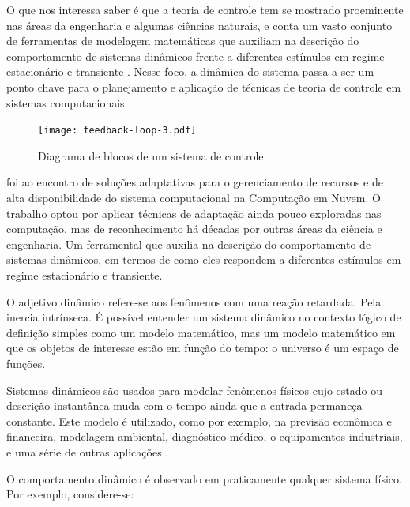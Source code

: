 O que nos interessa saber é que a teoria de controle tem se mostrado proeminente nas áreas da engenharia e algumas ciências naturais, e conta um vasto conjunto de ferramentas de modelagem matemáticas que auxiliam na descrição do comportamento de sistemas dinâmicos frente a diferentes estímulos em regime estacionário e transiente \cite{Nobile2013}. Nesse foco, a dinâmica do sistema passa a ser um ponto chave para o planejamento e aplicação de técnicas de teoria de controle em sistemas computacionais. 

\begin{figure}[htb]	
	\centering
	\texttt{[image: feedback-loop-3.pdf]}
	\caption{Diagrama de blocos de um sistema de controle}
	\label{fig:feedback-nobile}	
\end{figure}

 foi ao encontro de soluções adaptativas para o gerenciamento de recursos e de alta disponibilidade do sistema computacional na Computação em Nuvem. O trabalho optou por aplicar técnicas de adaptação ainda pouco exploradas nas computação, mas de reconhecimento há décadas por outras áreas da ciência e engenharia. Um ferramental que auxilia na descrição do comportamento de sistemas dinâmicos, em termos de como eles respondem a diferentes estímulos em regime estacionário e transiente.

O adjetivo dinâmico refere-se aos fenômenos com uma reação retardada. Pela inercia intrínseca. É possível entender um sistema dinâmico no contexto lógico de definição simples como um modelo matemático, mas um modelo matemático em que os objetos de interesse estão em função do tempo: o universo é um espaço de funções.

Sistemas dinâmicos são usados para modelar fenômenos físicos cujo estado ou descrição instantânea muda com o tempo ainda que a entrada permaneça constante. Este modelo é utilizado, como por exemplo, na previsão econômica e financeira, modelagem ambiental, diagnóstico médico, o equipamentos industriais, e uma série de outras aplicações \cite{Dean1991}.

O comportamento dinâmico é observado em praticamente qualquer sistema físico. Por exemplo, considere-se:

